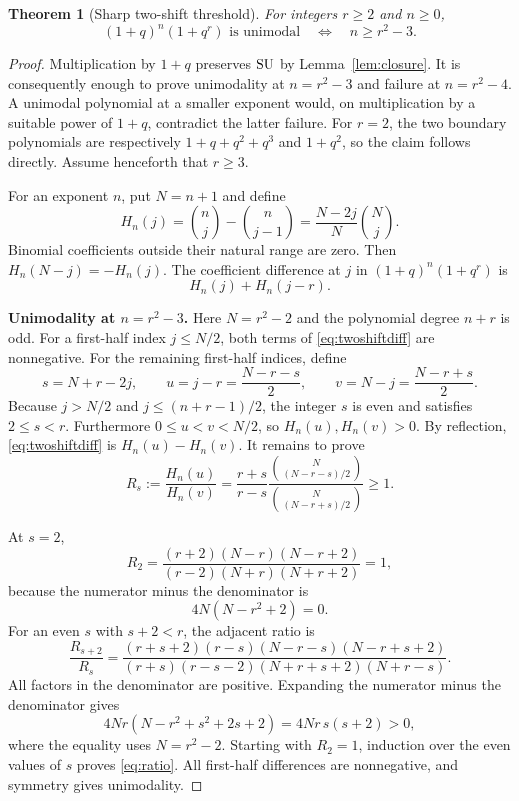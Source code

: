 \documentclass[11pt]{article}
\theoremstyle{research}
\newtheorem{theorem}{Theorem}[section]
\theoremstyle{definition}
\newcommand{\SU}{\textup{SU}}
\numberwithin{equation}{section}
\begin{document}
\begin{theorem}[Sharp two-shift threshold]\label{thm:twoshift}
For integers $r\ge2$ and $n\ge0$,
\begin{equation}\label{eq:twoshift}
 (1+q)^n(1+q^r)\text{ is unimodal}
 \quad\Longleftrightarrow\quad n\ge r^2-3.
\end{equation}
\end{theorem}
\begin{proof}
Multiplication by $1+q$ preserves $\SU$ by Lemma~\ref{lem:closure}.
It is consequently enough to prove unimodality at $n=r^2-3$ and failure
at $n=r^2-4$. A unimodal polynomial at a smaller exponent would, on
multiplication by a suitable power of $1+q$, contradict the latter failure.
For $r=2$, the two boundary polynomials are respectively
$1+q+q^2+q^3$ and $1+q^2$, so the claim follows directly.
Assume henceforth that $r\ge3$.

For an exponent $n$, put $N=n+1$ and define
\begin{equation}\label{eq:H}
 H_n(j)=\binom nj-\binom n{j-1}
       =\frac{N-2j}{N}\binom Nj.
\end{equation}
Binomial coefficients outside their natural range are zero. Then
$H_n(N-j)=-H_n(j)$.
The coefficient difference at $j$ in $(1+q)^n(1+q^r)$ is
\begin{equation}\label{eq:twoshiftdiff}
 H_n(j)+H_n(j-r).
\end{equation}

\medskip\noindent\textbf{Unimodality at $n=r^2-3$.}
Here $N=r^2-2$ and the polynomial degree $n+r$ is odd.
For a first-half index $j\le N/2$, both terms of
\eqref{eq:twoshiftdiff} are nonnegative.
For the remaining first-half indices, define
\[
 s=N+r-2j,\qquad
 u=j-r=\frac{N-r-s}{2},\qquad
 v=N-j=\frac{N-r+s}{2}.
\]
Because $j>N/2$ and $j\le(n+r-1)/2$, the integer $s$ is even and
satisfies $2\le s<r$. Furthermore $0\le u<v<N/2$, so $H_n(u),H_n(v)>0$.
By reflection, \eqref{eq:twoshiftdiff} is $H_n(u)-H_n(v)$.
It remains to prove
\begin{equation}\label{eq:ratio}
 R_s:=\frac{H_n(u)}{H_n(v)}
 =\frac{r+s}{r-s}
   \frac{\binom N{(N-r-s)/2}}{\binom N{(N-r+s)/2}}
 \ge1.
\end{equation}

At $s=2$,
\[
 R_2=\frac{(r+2)(N-r)(N-r+2)}
           {(r-2)(N+r)(N+r+2)}=1,
\]
because the numerator minus the denominator is
\begin{equation}\label{eq:ratio-base}
 4N(N-r^2+2)=0.
\end{equation}
For an even $s$ with $s+2<r$, the adjacent ratio is
\begin{equation}\label{eq:ratio-step}
 \frac{R_{s+2}}{R_s}
 =\frac{(r+s+2)(r-s)(N-r-s)(N-r+s+2)}
        {(r+s)(r-s-2)(N+r+s+2)(N+r-s)}.
\end{equation}
All factors in the denominator are positive. Expanding the numerator
minus the denominator gives
\begin{equation}\label{eq:ratio-positive}
 4Nr(N-r^2+s^2+2s+2)=4Nr\,s(s+2)>0,
\end{equation}
where the equality uses $N=r^2-2$.
Starting with $R_2=1$, induction over the even values of $s$ proves
\eqref{eq:ratio}. All first-half differences are nonnegative, and
symmetry gives unimodality.


\end{proof}
\end{document}
